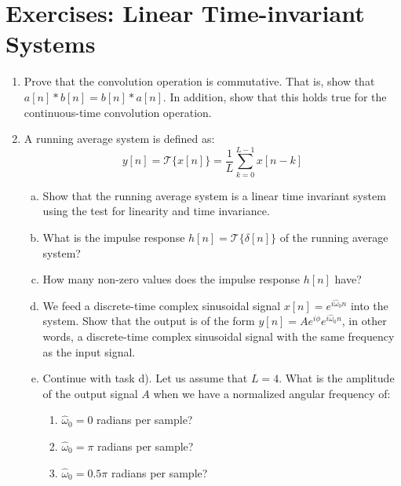 \newpage
\section{Exercises: Linear Time-invariant Systems}
\begin{enumerate}

  \item Prove that the convolution operation is commutative.
        That is, show that $a[n]*b[n]=b[n]*a[n]$. In addition, show that
        this holds true for the continuous-time convolution operation.

  \item A running average system is defined as:
        \begin{equation}
          y[n] = \mathcal{T}\{x[n]\} = \frac{1}{L}\sum_{k=0}^{L-1} x[n-k]
        \end{equation}

        \begin{enumerate}[a)]
          \item Show that the running average system is a linear time
                invariant system using the test for linearity and time
                invariance.
          \item What is the impulse response $h[n] =
                  \mathcal{T}\{\delta[n]\}$ of the running average system?
          \item How many non-zero values does the impulse response $h[n]$ have?
          \item We feed a discrete-time complex sinusoidal signal
                $x[n]=e^{i\hat{\omega}_0 n}$ into the system. Show that the
                output is of the form $y[n]=A e^{i\phi} e^{i\hat{\omega}_0 n}$,
                in other words, a discrete-time complex sinusoidal signal with
                the same frequency as the input signal.
          \item Continue with task d). Let us assume that
                $L=4$. What is the amplitude of the output signal $A$ when we
                have a normalized angular frequency of:
                \begin{enumerate}
                  \item $\hat{\omega}_0 = 0$ radians per sample?
                  \item $\hat{\omega}_0 = \pi$ radians per sample?
                  \item $\hat{\omega}_0 = 0.5\pi$ radians per sample?
                \end{enumerate}


\end{enumerate}
\end{enumerate}
